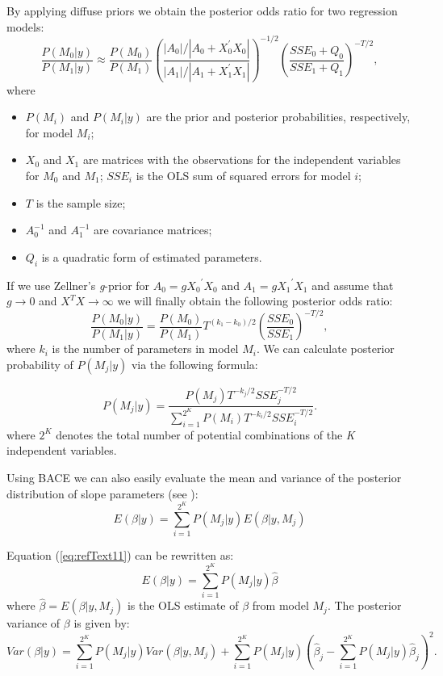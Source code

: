By applying diffuse priors we obtain the posterior odds ratio for two
regression models:
\begin{equation}
\frac{P(M_0|y)}{P(M_1|y)} \approx
\frac{P(M_0)}{P(M_1)}\left(\frac{|A_0|/|A_0 + X_0^{'}X_0|}{|A_1|/|A_1 + X_1^{'}X_1|}\right)^{-1/2}
\left(\frac{SSE_0+Q_0}{SSE_1+Q_1}\right)^{-T/2},
\end{equation}
where
\begin{itemize}
\item $P(M_i)$ and $P(M_i|y)$ are the prior and posterior
  probabilities, respectively, for model $M_i$;
\item $X_0$ and $X_1$ are matrices with the observations for the
  independent variables for $M_0$ and $M_1$;
  $SSE_i$ is the OLS sum of squared errors for model $i$;
\item $T$ is the sample size;
\item $A_0^{-1}$ and $A_1^{-1}$ are covariance matrices;
\item  $Q_i$ is a quadratic form of estimated parameters.
\end{itemize}

If we use Zellner's \textit{g}-prior \cite{Zellner1986} for
$A_0=\mathit{gX_0}^{'}X_0$ and $A_1=\mathit{gX_1}^{'}X_1$
and assume that $g\rightarrow 0$ and $X^{T}X\rightarrow \infty$
we will finally obtain the following posterior odds ratio:
\begin{equation}\label{eq:refText9}
\frac{P(M_0|y)}{P(M_1|y)}=\frac{P(M_0)}{P(M_1)}T^{(k_1-k_0)/2}
\left(\frac{SSE_0}{SSE_1}\right)^{-T/2},
\end{equation}
where $k_i$ is the number of parameters in model $M_i$.  We can
calculate posterior probability of $P(M_j|y)$ via the following
formula:

\begin{equation}
P(M_j|y)=\frac{P(M_j)T^{-k_j/2}SSE_j^{-T/2}}
    {\sum_{i=1}^{2^K}P(M_i)T^{-k_i/2}SSE_i^{-T/2}}.
\end{equation}
where $2^K$ denotes the total number of potential combinations of the
\textit{K} independent variables.

Using BACE we can also easily evaluate the mean and variance of
the posterior distribution of slope parameters (see \cite{Leamer1978}):
\begin{equation}\label{eq:refText11}
E(\beta |y)=\sum_{i=1}^{2^K}P(M_j|y)E(\beta |y,M_j)
\end{equation}

Equation (\ref{eq:refText11}) can be rewritten as:
\begin{equation}
E(\beta |y)=\sum _{i=1}^{2^K}P(M_j|y)\hat{\beta}
\end{equation}
where $\hat{\beta}=E(\beta |y,M_j)$ is the OLS estimate of $\beta$
from model $M_j$. The posterior variance of $\beta$ is given by:
\begin{equation}
Var(\beta |y) = 
\sum_{i=1}^{2^K}P(M_j|y)Var(\beta |y,M_j) +
\sum_{i=1}^{2^K}P(M_j|y)\left(\hat{\beta}_j -
\sum_{i=1}^{2^K}P(M_j|y)\hat{\beta}_j\right)^2.
\end{equation}

